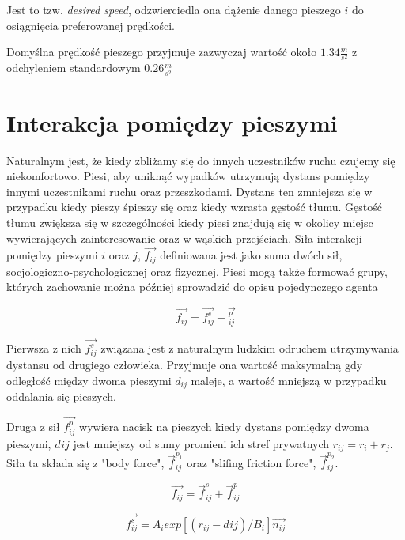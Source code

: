 Jest to tzw. \textit{desired speed}, odzwierciedla ona dążenie danego pieszego $i$ do osiągnięcia preferowanej prędkości.

Domyślna prędkość pieszego przyjmuje zazwyczaj wartość około $1.34 \frac{m}{s^{2}}$ z odchyleniem standardowym $0.26 \frac{m}{s^{2}}$ \cite{HeBuAjTw}

\section{Interakcja pomiędzy pieszymi}
\label{sec:interactionBetweenPedestrians}

Naturalnym jest, że kiedy zbliżamy się do innych uczestników ruchu czujemy się niekomfortowo. Piesi, aby uniknąć wypadków utrzymują dystans pomiędzy innymi uczestnikami ruchu oraz przeszkodami. Dystans ten zmniejsza się w przypadku kiedy pieszy śpieszy się oraz kiedy wzrasta gęstość tłumu. Gęstość tłumu zwiększa się w szczególności kiedy piesi znajdują się w okolicy miejsc wywierających zainteresowanie oraz w wąskich przejściach. Siła interakcji pomiędzy pieszymi $i$ oraz $j$, $\vec{f_{ij}}$ definiowana jest jako suma dwóch sił, socjologiczno-psychologicznej oraz fizycznej. Piesi mogą także formować grupy, których zachowanie można później sprowadzić do opisu pojedynczego agenta \cite{HeBuAjTw}

\begin{equation}
\vec{f_{ij}} = \vec{f_{ij}^{s}} + \vec{_{ij}^{p}}
\end{equation}

Pierwsza z nich $\vec{f_{ij}^{s}}$ związana jest z naturalnym ludzkim odruchem utrzymywania dystansu od drugiego człowieka. Przyjmuje ona wartość maksymalną gdy odległość między dwoma pieszymi $d_{ij}$ maleje, a wartość mniejszą w przypadku oddalania się pieszych.

Druga z sił $\vec{f_{ij}^{p}}$ wywiera nacisk na pieszych kiedy dystans pomiędzy dwoma pieszymi, $d_{}ij$ jest mniejszy od sumy promieni ich stref prywatnych $r_{ij} = r_{i} + r_{j}$. Siła ta składa się z "body force", $\vec{f} _{ij}^{p_{1}}$ oraz "slifing friction force", $\vec{f} _{ij}^{p_{2}}$.

\begin{equation}
\vec{f_{ij}} = \vec{f}_{ij}^{s} + \vec{f}_{ij}^{p}
\end{equation}

\begin{equation}
\vec{f_{ij}^{s}} = A_{i} exp[(r_{ij} - d_{}ij) / B_{i}]\vec{n_{ij}}
\end{equation}

